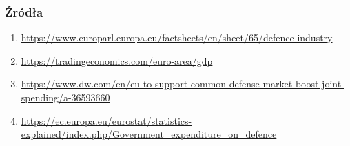 \documentclass{beamer}
\begin{document}
\begin{frame}
    \frametitle{Źródła}

    \begin{small}
    \begin{enumerate}
        \item \url{https://www.europarl.europa.eu/factsheets/en/sheet/65/defence-industry}
        \item \url{https://tradingeconomics.com/euro-area/gdp}
        \item \url{https://www.dw.com/en/eu-to-support-common-defense-market-boost-joint-spending/a-36593660}
        \item
            \url{https://ec.europa.eu/eurostat/statistics-explained/index.php/Government_expenditure_on_defence}
    \end{enumerate}
    \end{small}
\end{frame}
\end{document}

